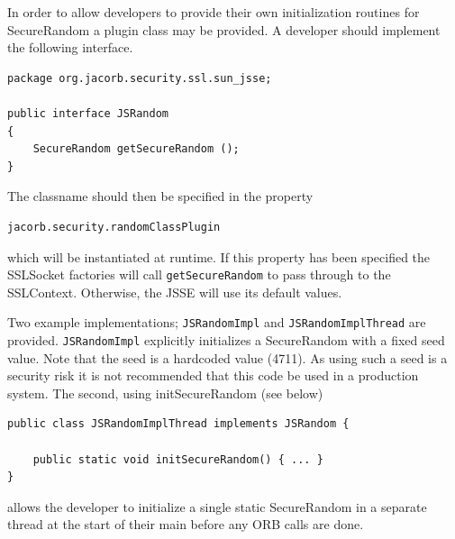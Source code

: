 In order to allow developers to provide their own initialization
routines for SecureRandom a plugin class may be provided. A developer
should implement the following interface.

\begin{small}
\begin{verbatim}
package org.jacorb.security.ssl.sun_jsse;

public interface JSRandom
{
    SecureRandom getSecureRandom ();
}
\end{verbatim}
\end{small}

The classname should then be specified in the property

\begin{verbatim}
jacorb.security.randomClassPlugin
\end{verbatim}
 which will be instantiated at runtime. If this property has been
specified the SSLSocket factories will call {\tt getSecureRandom}
to pass through to the SSLContext. Otherwise, the JSSE will use its
default values.

Two example implementations; {\tt JSRandomImpl} and {\tt JSRandomImplThread}
are provided. {\tt JSRandomImpl} explicitly initializes a SecureRandom with
a fixed seed value. Note that the seed is a hardcoded value (4711). As using
such a seed is a security risk it is not recommended that this code be used
in a production system. The second, using initSecureRandom (see below)

\begin{small}
\begin{verbatim}
public class JSRandomImplThread implements JSRandom {

    public static void initSecureRandom() { ... }
}
\end{verbatim}
\end{small}

allows the developer to initialize a single static SecureRandom
in a separate thread at the start of their main before any ORB
calls are done.



